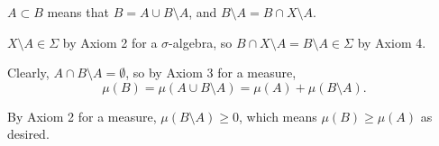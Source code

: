 \(A \subset B\) means that \(B = A \cup B \setminus A\), and \(B \setminus A = B \cap X \setminus A\).

\(X \setminus A \in \Sigma\) by Axiom 2 for a \(\sigma\)-algebra, so \(B \cap X \setminus A = B \setminus A \in \Sigma\) by Axiom 4.

Clearly, \(A \cap B \setminus A = \emptyset\), so by Axiom 3 for a measure,
\[
\mu(B) = \mu(A \cup B\setminus A) = \mu(A) + \mu(B \setminus A).
\]

By Axiom 2 for a measure, \(\mu(B\setminus A) \geq 0\), which means \(\mu(B) \geq \mu(A)\) as desired.
